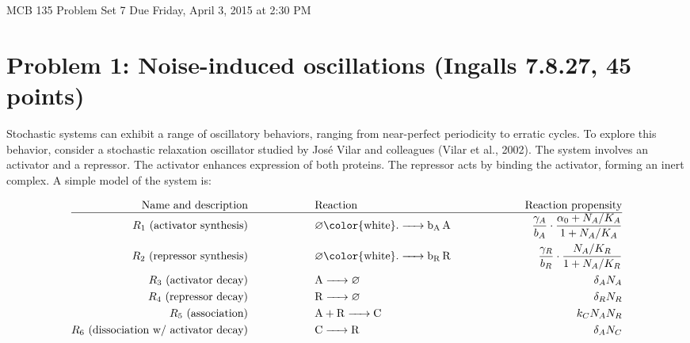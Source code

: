 \documentclass{article}
\begin{document}
\large

MCB 135 Problem Set 7 \hfill Due Friday, April 3, 2015 at 2:30 PM

\section*{Problem 1: Noise-induced oscillations (Ingalls 7.8.27, 45 points)}

Stochastic systems can exhibit a range of oscillatory behaviors, ranging from near-perfect periodicity to erratic cycles. To explore this behavior, consider a stochastic relaxation oscillator studied by Jos\'{e} Vilar and colleagues (Vilar et al., 2002). The system involves an activator and a repressor. The activator enhances expression of both proteins. The repressor acts by binding the activator, forming an inert complex. A simple model of the system is:

\begin{eqnarray*}
\textrm{ Name and description } \hspace{2 cm} & \textrm{Reaction} & \hspace{2 cm} \textrm{Reaction propensity}\\ \hline
R_1 \textrm{ (activator synthesis) } \hspace{2 cm} & \ce{\varnothing {\color{white}.} -> b_A A} & \hspace{2 cm} \frac{\gamma_A}{b_A} \cdot \frac{\alpha_0 + N_A/K_A}{1 + N_A/K_A}\\
R_2 \textrm{ (repressor synthesis) } \hspace{2 cm} & \ce{\varnothing {\color{white}.} -> b_R R} & \hspace{2 cm} \frac{\gamma_R}{b_R} \cdot \frac{N_A/K_R}{1 + N_A/K_R}\\
R_3 \textrm{ (activator decay) } \hspace{2 cm} & \ce{A -> \varnothing} & \hspace{2 cm} \delta_A N_A \\
R_4 \textrm{ (repressor decay) } \hspace{2 cm} & \ce{R -> \varnothing} & \hspace{2 cm} \delta_R N_R \\
R_5 \textrm{ (association) } \hspace{2 cm} & \ce{A + R -> C} & \hspace{2 cm} k_C N_A N_R \\
R_6 \textrm{ (dissociation w/ activator decay) } \hspace{2 cm} & \ce{C -> R} & \hspace{2 cm} \delta_A N_C \\
\end{eqnarray*}
\end{document}
